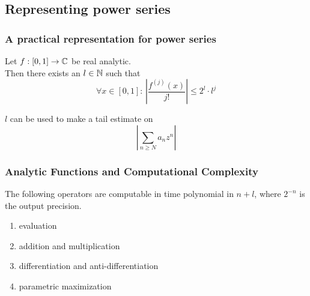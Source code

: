 
\subsection{Representing power series}
\begin{frame}
\frametitle{A practical representation for power series}
\begin{lemma}
  Let $f : [0,1] \to \mathbb{C}$ be real analytic.\\
  Then there exists an $l \in \mathbb{N}$ such that 
  $$ \forall x \in [0,1]: \, \left | \frac{f^{(j)}(x)}{j!} \right | \leq 2^l\cdot l^j $$
\end{lemma}
\pause
$l$ can be used to make a tail estimate on
$$ \left | \sum_{n \geq N} a_n z^n \right |  $$
\end{frame}
\begin{frame}[<+->]
\frametitle{Analytic Functions and Computational Complexity}
\begin{theorem}
  The following operators are computable in time polynomial in $n+l$, where $2^{-n}$ is the output precision.
\begin{enumerate}
\item evaluation
\item addition and multiplication
\item differentiation and anti-differentiation
\item parametric maximization
\end{enumerate}
\end{theorem}
\end{frame}

